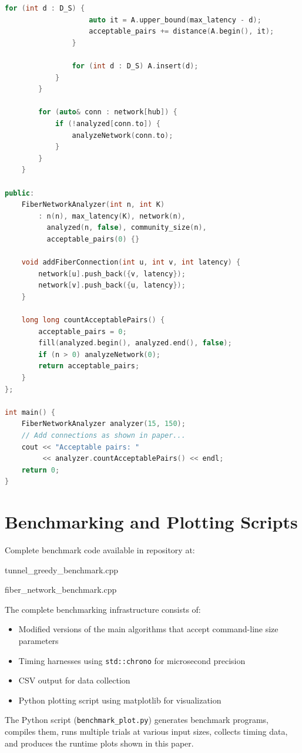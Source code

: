 \documentclass[sigconf]{acmart}
\begin{document}
\begin{lstlisting}[language=C++]
                for (int d : D_S) {
                    auto it = A.upper_bound(max_latency - d);
                    acceptable_pairs += distance(A.begin(), it);
                }
                
                for (int d : D_S) A.insert(d);
            }
        }
        
        for (auto& conn : network[hub]) {
            if (!analyzed[conn.to]) {
                analyzeNetwork(conn.to);
            }
        }
    }
    
public:
    FiberNetworkAnalyzer(int n, int K) 
        : n(n), max_latency(K), network(n), 
          analyzed(n, false), community_size(n), 
          acceptable_pairs(0) {}
    
    void addFiberConnection(int u, int v, int latency) {
        network[u].push_back({v, latency});
        network[v].push_back({u, latency});
    }
    
    long long countAcceptablePairs() {
        acceptable_pairs = 0;
        fill(analyzed.begin(), analyzed.end(), false);
        if (n > 0) analyzeNetwork(0);
        return acceptable_pairs;
    }
};

int main() {
    FiberNetworkAnalyzer analyzer(15, 150);
    // Add connections as shown in paper...
    cout << "Acceptable pairs: " 
         << analyzer.countAcceptablePairs() << endl;
    return 0;
}
\end{lstlisting}

\section{Benchmarking and Plotting Scripts}
\label{app:benchmarks}
Complete benchmark code available in repository at:

tunnel\_greedy\_benchmark.cpp

fiber\_network\_benchmark.cpp

The complete benchmarking infrastructure consists of:\begin{itemize}[leftmargin=*]
  \item Modified versions of the main algorithms that accept command-line size parameters
  \item Timing harnesses using \texttt{std::chrono} for microsecond precision
  \item CSV output for data collection
  \item Python plotting script using matplotlib for visualization
\end{itemize}
The Python script (\texttt{benchmark\_plot.py}) generates benchmark programs, compiles them, runs multiple trials at various input sizes, collects timing data, and produces the runtime plots shown in this paper.


\end{document}
